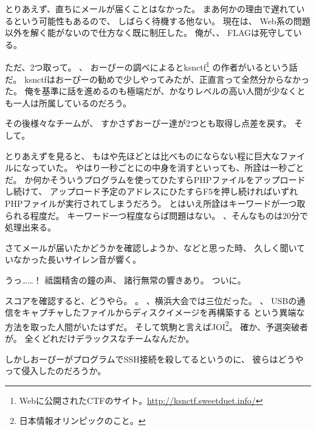 とりあえず、直ちにメールが届くことはなかった。
まあ何かの理由で遅れているという可能性もあるので、
しばらく待機する他ない。
現在は、
Web系の問題以外を解く能がないので仕方なく既に制圧した。
俺が、、
FLAGは死守している。

ただ、2つ取って。
、
おーぴーの調べによるとksnctf\footnote{Webに公開されたCTFのサイト。\url{http://ksnctf.sweetduet.info/}}%
の作者がいるという話だ。
ksnctfはおーぴーの勧めで少しやってみたが、正直言って全然分からなかった。
俺を基準に話を進めるのも極端だが、かなりレベルの高い人間が少なくとも一人は所属しているのだろう。

その後様々なチームが、
すかさずおーぴー達が2つとも取得し点差を戻す。
そして。

とりあえずを見ると、
もはや先ほどとは比べものにならない程に巨大なファイルになっていた。
やはり一秒ごとにの中身を消すといっても、所詮は一秒ごとだ。
か何かそういうプログラムを使ってひたすらPHPファイルをアップロードし続けて、
アップロード予定のアドレスにひたすらF5を押し続ければいずれPHPファイルが実行されてしまうだろう。
とはいえ所詮はキーワードが一つ取られる程度だ。
キーワード一つ程度ならば問題はない。
、そんなものは20分で処理出来る。

さてメールが届いたかどうかを確認しようか、などと思った時、
久しく聞いていなかった長いサイレン音が響く。

うっ……！
祗園精舎の鐘の声、
諸行無常の響きあり。
ついに。

スコアを確認すると、どうやら。
。
、横浜大会では三位だった。
、
USBの通信をキャプチャしたファイルからディスクイメージを再構築する
という異端な方法を取った人間がいたはずだ。
そして筑駒と言えばJOI\footnote{日本情報オリンピックのこと。}。
確か、予選突破者が。
全くどれだけデラックスなチームなんだか。

しかしおーぴーがプログラムでSSH接続を殺してるというのに、
彼らはどうやって侵入したのだろうか。

